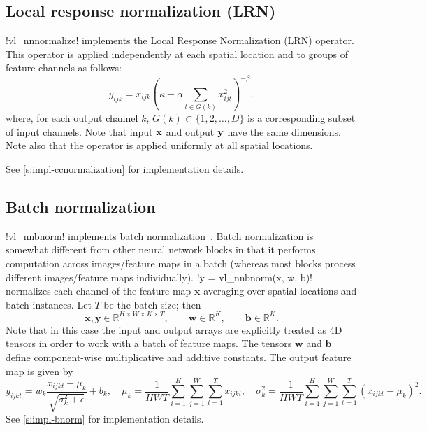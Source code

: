\subsection{Local response normalization (LRN)}\label{s:ccnormalization}

!vl_nnnormalize! implements the Local Response Normalization (LRN) operator. This operator is applied independently at each spatial location and to groups of feature channels as follows:
\[
 y_{ijk} = x_{ijk} \left( \kappa + \alpha \sum_{t\in G(k)} x_{ijt}^2 \right)^{-\beta},
\]
where, for each output channel $k$, $G(k) \subset \{1, 2, \dots, D\}$ is a corresponding subset of input channels. Note that input $\mathbf{x}$ and output $\mathbf{y}$ have the same dimensions. Note also that the operator is applied uniformly at all spatial locations.

See \cref{s:impl-ccnormalization} for implementation details.

\subsection{Batch normalization}\label{s:bnorm}

!vl_nnbnorm! implements batch normalization~\cite{ioffe2015}. Batch normalization is somewhat different from other neural network blocks in that it performs computation across images/feature maps in a batch (whereas most blocks process different images/feature maps individually). !y = vl_nnbnorm(x, w, b)! normalizes each channel of the feature map $\mathbf{x}$ averaging over spatial locations and batch instances. Let $T$ be the batch size; then
\[
\mathbf{x}, \mathbf{y} \in \mathbb{R}^{H \times W \times K \times T},
\qquad\mathbf{w} \in \mathbb{R}^{K},
\qquad\mathbf{b} \in \mathbb{R}^{K}.
\]
Note that in this case the input and output arrays are explicitly treated as 4D tensors in order to work with a batch of feature maps. The tensors  $\mathbf{w}$ and $\mathbf{b}$ define component-wise multiplicative and additive constants. The output feature map is given by
\[
y_{ijkt} = w_k \frac{x_{ijkt} - \mu_{k}}{\sqrt{\sigma_k^2 + \epsilon}} + b_k,
\quad
\mu_{k} = \frac{1}{HWT}\sum_{i=1}^H \sum_{j=1}^W \sum_{t=1}^{T} x_{ijkt},
\quad
\sigma^2_{k} = \frac{1}{HWT}\sum_{i=1}^H \sum_{j=1}^W \sum_{t=1}^{T} (x_{ijkt} - \mu_{k})^2.
\]
See \cref{s:impl-bnorm} for implementation details.

